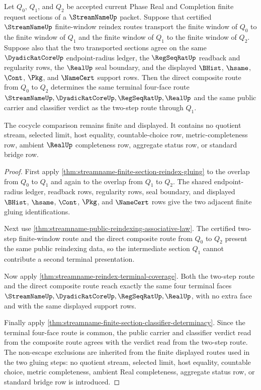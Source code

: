 \begin{theorem}
\label{thm:streamname-finite-section-reindex-cocycle}
Let $Q_0$, $Q_1$, and $Q_2$ be accepted current Phase Real and Completion
finite request sections of a $\StreamNameUp$ packet. Suppose that certified
$\StreamNameUp$ finite-window reindex routes transport the finite window of
$Q_0$ to the finite window of $Q_1$ and the finite window of $Q_1$ to the
finite window of $Q_2$. Suppose also that the two transported sections agree
on the same $\DyadicRatCoreUp$ endpoint-radius ledger, the $\RegSeqRatUp$
readback and regularity rows, the $\RealUp$ seal boundary, and the displayed
$\BHist$, $\hsame$, $\Cont$, $\Pkg$, and $\NameCert$ support rows. Then the
direct composite route from $Q_0$ to $Q_2$ determines the same terminal
four-face route $\StreamNameUp,\DyadicRatCoreUp,\RegSeqRatUp,\RealUp$ and the
same public carrier and classifier verdict as the two-step route through
$Q_1$.

The cocycle comparison remains finite and displayed. It contains no quotient
stream, selected limit, host equality, countable-choice row,
metric-completeness row, ambient $\RealUp$ completeness row, aggregate status
row, or standard bridge row.
\end{theorem}
\begin{proof}
First apply \autoref{thm:streamname-finite-section-reindex-gluing} to the
overlap from $Q_0$ to $Q_1$ and again to the overlap from $Q_1$ to $Q_2$. The
shared endpoint-radius ledger, readback rows, regularity rows, seal boundary,
and displayed $\BHist$, $\hsame$, $\Cont$, $\Pkg$, and $\NameCert$ rows give
the two adjacent finite gluing identifications.

Next use \autoref{thm:streamname-public-reindexing-associative-law}. The
certified two-step finite-window route and the direct composite route from
$Q_0$ to $Q_2$ present the same public reindexing data, so the intermediate
section $Q_1$ cannot contribute a second terminal presentation.

Now apply \autoref{thm:streamname-reindex-terminal-coverage}. Both the
two-step route and the direct composite route reach exactly the same four
terminal faces $\StreamNameUp,\DyadicRatCoreUp,\RegSeqRatUp,\RealUp$, with no
extra face and with the same displayed support rows.

Finally apply
\autoref{thm:streamname-finite-section-classifier-determinacy}. Since the
terminal four-face route is common, the public carrier and classifier verdict
read from the composite route agrees with the verdict read from the two-step
route. The non-escape exclusions are inherited from the finite displayed
routes used in the two gluing steps: no quotient stream, selected limit, host
equality, countable choice, metric completeness, ambient Real completeness,
aggregate status row, or standard bridge row is introduced.
\end{proof}
